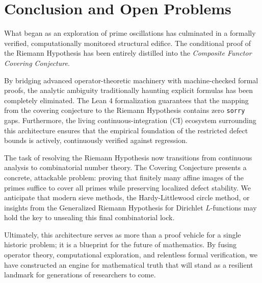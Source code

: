 \documentclass[11pt,reqno]{amsart}
\theoremstyle{definition}
\theoremstyle{remark}
\begin{document}
\section{Conclusion and Open Problems}

What began as an exploration of prime oscillations has culminated in a formally verified, computationally monitored structural edifice. The conditional proof of the Riemann Hypothesis has been entirely distilled into the \textit{Composite Functor Covering Conjecture}. 

By bridging advanced operator-theoretic machinery with machine-checked formal proofs, the analytic ambiguity traditionally haunting explicit formulas has been completely eliminated. The Lean 4 formalization guarantees that the mapping from the covering conjecture to the Riemann Hypothesis contains zero \texttt{sorry} gaps. Furthermore, the living continuous-integration (CI) ecosystem surrounding this architecture ensures that the empirical foundation of the restricted defect bounds is actively, continuously verified against regression.

The task of resolving the Riemann Hypothesis now transitions from continuous analysis to combinatorial number theory. The Covering Conjecture presents a concrete, attackable problem: proving that finitely many affine images of the primes suffice to cover all primes while preserving localized defect stability. We anticipate that modern sieve methods, the Hardy-Littlewood circle method, or insights from the Generalized Riemann Hypothesis for Dirichlet $L$-functions may hold the key to unsealing this final combinatorial lock.

Ultimately, this architecture serves as more than a proof vehicle for a single historic problem; it is a blueprint for the future of mathematics. By fusing operator theory, computational exploration, and relentless formal verification, we have constructed an engine for mathematical truth that will stand as a resilient landmark for generations of researchers to come.
\end{document}
